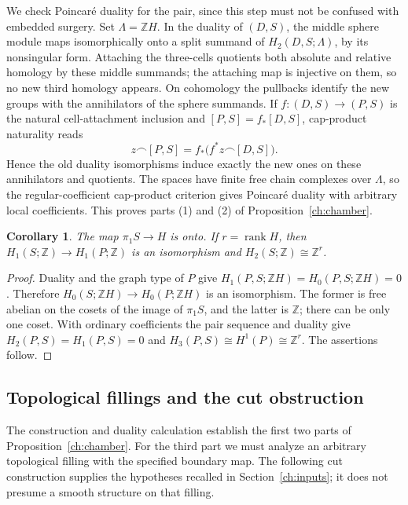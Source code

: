 \documentclass[11pt]{article}
\newtheorem{corollary}[theorem]{Corollary}
\theoremstyle{definition}
\theoremstyle{remark}
\newcommand{\Z}{\mathbb Z}
\begin{document}
We check Poincar\'e duality for the pair, since this step must not be
confused with embedded surgery.  Set $\Lambda=\Z H$.  In the duality
of $(D,S)$, the middle sphere module maps isomorphically onto a split
summand of $H_2(D,S;\Lambda)$, by its nonsingular form.  Attaching the
three-cells quotients both absolute and relative homology by these
middle summands; the attaching map is injective on them, so no new
third homology appears.  On cohomology the pullbacks identify the new
groups with the annihilators of the sphere summands.  If
$f:(D,S)\to(P,S)$ is the natural cell-attachment inclusion and
$[P,S]=f_*[D,S]$, cap-product naturality reads
\[
 z\frown[P,S]=f_*\bigl(f^*z\frown[D,S]\bigr).
\]
Hence the old duality isomorphisms induce exactly the new ones on
these annihilators and quotients.  The spaces have finite free chain
complexes over $\Lambda$, so the regular-coefficient cap-product
criterion gives Poincar\'e duality with arbitrary local coefficients.
This proves parts (1) and (2) of Proposition~\ref{ch:chamber}.

\begin{corollary}
\label{ch:boundary-homology}
The map $\pi_1S\to H$ is onto.  If $r=\operatorname{rank}H$, then
$H_1(S;\Z)\to H_1(P;\Z)$ is an isomorphism and
$H_2(S;\Z)\cong\Z^r$.
\end{corollary}

\begin{proof}
Duality and the graph type of $P$ give
$H_1(P,S;\Z H)=H_0(P,S;\Z H)=0$.  Therefore
$H_0(S;\Z H)\to H_0(P;\Z H)$ is an isomorphism.
The former is free abelian on the cosets of the image of $\pi_1S$,
and the latter is $\Z$; there can be only one coset.
With ordinary coefficients the pair sequence and duality give
$H_2(P,S)=H_1(P,S)=0$ and
$H_3(P,S)\cong H^1(P)\cong\Z^r$.  The assertions follow.
\end{proof}

\subsection{Topological fillings and the cut obstruction}
\label{ch:forbidden-filling}

The construction and duality calculation establish the first two parts
of Proposition~\ref{ch:chamber}. For the third part we must analyze an
arbitrary topological filling with the specified boundary map. The
following cut construction supplies the hypotheses recalled in
Section~\ref{ch:inputs}; it does not presume a smooth structure on that
filling.
\end{document}
